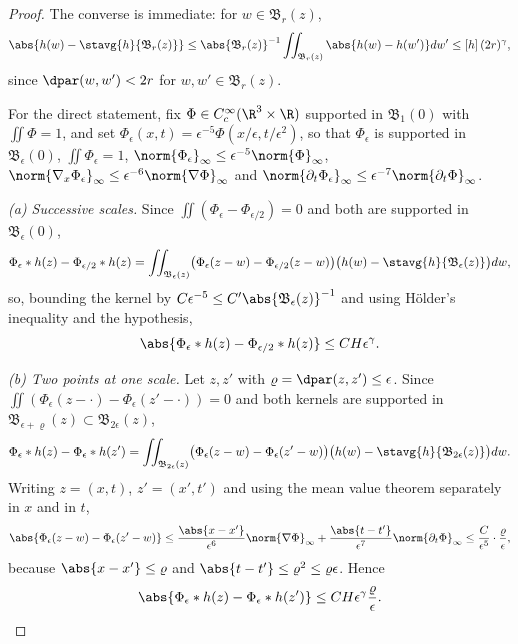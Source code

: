 \documentclass[11pt,reqno]{amsart}
\begin{document}
\begin{proof}
The converse is immediate: for $w\in\mathfrak{B}_{r}(z)$,
\[
\abs{h(w)-\stavg{h}{\mathfrak{B}_{r}(z)}}
 \le\abs{\mathfrak{B}_{r}(z)}^{-1}\iint_{\mathfrak{B}_{r}(z)}\abs{h(w)-h(w')}dw'
 \le[h]\,(2r)^{\gamma}
,
\] since $\dpar(w,w')<2r$ for $w,w'\in\mathfrak{B}_{r}(z)$.

For the direct statement, fix $\Phi\in C_{c}^{\infty}(\R^{3}\times\R)$ supported
in $\mathfrak{B}_{1}(0)$ with $\iint\Phi=1$, and set
$\Phi_{\epsilon}(x,t)=\epsilon^{-5}\Phi(x/\epsilon,t/\epsilon^{2})$, so that
$\Phi_{\epsilon}$ is supported in $\mathfrak{B}_{\epsilon}(0)$,
$\iint\Phi_{\epsilon}=1$,
$\norm{\Phi_{\epsilon}}_{\infty}\le\epsilon^{-5}\norm{\Phi}_{\infty}$,
$\norm{\nabla_{x}\Phi_{\epsilon}}_{\infty}\le\epsilon^{-6}\norm{\nabla\Phi}_{\infty}$
and
$\norm{\partial_{t}\Phi_{\epsilon}}_{\infty}\le\epsilon^{-7}\norm{\partial_{t}\Phi}_{\infty}$.

\emph{(a) Successive scales.} Since $\iint(\Phi_{\epsilon}-\Phi_{\epsilon/2})=0$
and both are supported in $\mathfrak{B}_{\epsilon}(0)$,
\[
  \Phi_{\epsilon}*h(z)-\Phi_{\epsilon/2}*h(z)
  =\iint_{\mathfrak{B}_{\epsilon}(z)}
    \bigl(\Phi_{\epsilon}(z-w)-\Phi_{\epsilon/2}(z-w)\bigr)
    \bigl(h(w)-\stavg{h}{\mathfrak{B}_{\epsilon}(z)}\bigr)dw ,
\]
so, bounding the kernel by
$C\epsilon^{-5}\le C'\abs{\mathfrak{B}_{\epsilon}(z)}^{-1}$ and using
H\"older's inequality and the hypothesis,
\begin{equation}\label{eq:campanato-scales}
  \abs{\Phi_{\epsilon}*h(z)-\Phi_{\epsilon/2}*h(z)}\le C H\epsilon^{\gamma}.
\end{equation}

\emph{(b) Two points at one scale.} Let $z,z'$ with
$\varrho=\dpar(z,z')\le\epsilon$. Since
$\iint(\Phi_{\epsilon}(z-\cdot)-\Phi_{\epsilon}(z'-\cdot))=0$ and both kernels
are supported in $\mathfrak{B}_{\epsilon+\varrho}(z)\subset\mathfrak{B}_{2\epsilon}(z)$,
\[
  \Phi_{\epsilon}*h(z)-\Phi_{\epsilon}*h(z')
  =\iint_{\mathfrak{B}_{2\epsilon}(z)}
    \bigl(\Phi_{\epsilon}(z-w)-\Phi_{\epsilon}(z'-w)\bigr)
    \bigl(h(w)-\stavg{h}{\mathfrak{B}_{2\epsilon}(z)}\bigr)dw .
\]
Writing $z=(x,t)$, $z'=(x',t')$ and using the mean value theorem separately in
$x$ and in $t$,
\[
  \abs{\Phi_{\epsilon}(z-w)-\Phi_{\epsilon}(z'-w)}
  \le\frac{\abs{x-x'}}{\epsilon^{6}}\norm{\nabla\Phi}_{\infty}
    +\frac{\abs{t-t'}}{\epsilon^{7}}\norm{\partial_{t}\Phi}_{\infty}
  \le\frac{C}{\epsilon^{5}}\cdot\frac{\varrho}{\epsilon},
\]
because $\abs{x-x'}\le\varrho$ and $\abs{t-t'}\le\varrho^{2}\le\varrho\epsilon$.
Hence
\begin{equation}\label{eq:campanato-points}
  \abs{\Phi_{\epsilon}*h(z)-\Phi_{\epsilon}*h(z')}
  \le C H\epsilon^{\gamma}\frac{\varrho}{\epsilon}.
\end{equation}


\end{proof}
\end{document}
